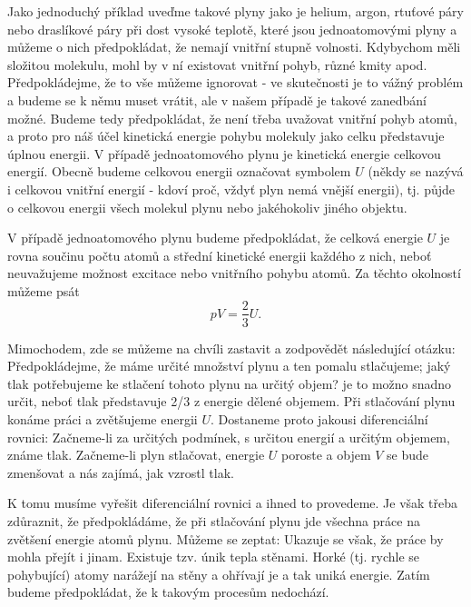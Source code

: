     Jako jednoduchý příklad uveďme takové plyny jako je helium, argon, rtuťové páry nebo draslíkové
    páry při dost vysoké teplotě, které jsou jednoatomovými plyny a můžeme o nich předpokládat, že
    nemají vnitřní stupně volnosti. Kdybychom měli složitou molekulu, mohl by v ní existovat vnitřní
    pohyb, různé kmity apod. Předpokládejme, že to vše můžeme ignorovat - ve skutečnosti je to vážný
    problém a budeme se k němu muset vrátit, ale v našem případě je takové zanedbání možné. Budeme
    tedy předpokládat, že není třeba uvažovat vnitřní pohyb atomů, a proto pro náš účel kinetická
    energie pohybu molekuly jako celku představuje úplnou energii. V případě jednoatomového plynu je
    kinetická energie celkovou energií. Obecně budeme celkovou energii označovat symbolem \(U\)
    (někdy se nazývá i celkovou vnitřní energií - kdoví proč, vždyť plyn nemá vnější energii), tj.
    půjde o celkovou energii všech molekul plynu nebo jakéhokoliv jiného objektu.

    V případě jednoatomového plynu budeme předpokládat, že celková energie \(U\) je rovna součinu
    počtu atomů a střední kinetické energii každého z nich, neboť neuvažujeme možnost excitace nebo
    vnitřního pohybu atomů. Za těchto okolností můžeme psát
    \begin{equation}\label{fyz:eq621}
      pV = \frac{2}{3}U.
    \end{equation}

    Mimochodem, zde se můžeme na chvíli zastavit a zodpovědět následující otázku: Předpokládejme, že
    máme určité množství plynu a ten pomalu stlačujeme; jaký tlak potřebujeme ke stlačení tohoto
    plynu na určitý objem? je to možno snadno určit, neboť tlak představuje \num{2/3} z energie
    dělené objemem. Při stlačování plynu konáme práci a zvětšujeme energii \(U\). Dostaneme proto
    jakousi diferenciální rovnici: Začneme-li za určitých podmínek, s určitou energií a určitým
    objemem, známe tlak. Začneme-li plyn stlačovat, energie \(U\) poroste a objem \(V\) se bude
    zmenšovat a nás zajímá, jak vzrostl tlak.

    K tomu musíme vyřešit diferenciální rovnici a ihned to provedeme. Je však třeba zdůraznit, že
    předpokládáme, že při stlačování plynu jde všechna práce na zvětšení energie atomů plynu. Můžeme
    se zeptat:  Ukazuje se
    však, že práce by mohla přejít i jinam. Existuje tzv. únik tepla stěnami. Horké (tj. rychle se
    pohybující) atomy narážejí na stěny a ohřívají je a tak uniká energie. Zatím budeme
    předpokládat, že k takovým procesům nedochází.

